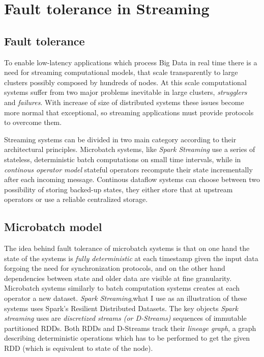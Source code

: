 \section{Fault tolerance in Streaming}


\subsection{Fault tolerance}\label{faultolerance}
To enable low-latency applications which process Big Data in real time there is a need for streaming computational models, that scale transparently to large clusters possibly composed by hundreds of nodes. At this scale computational systems suffer from two major problems inevitable in large clusters, \textit{strugglers} and \textit{failures}. With increase of size of distributed systems these issues become more normal that exceptional, so streaming applications must provide protocols to overcome them.

Streaming systems can be divided in two main category according to their architectural principles. Microbatch systems, like \textit{Spark Streaming} \cite{discretizedstreams} use a series of stateless, deterministic batch computations on small time intervals, while in \textit{continous operator model} stateful operators recompute their state incrementally after each incoming message. Continous dataflow systems can choose between two possibility of storing backed-up states, they either store that at upstream operators\cite{mapreduceonline}\cite{storm} or use a reliable centralized storage\cite{millwheel}\cite{stratosphere}. 
\subsection{Microbatch model}


The idea behind fault tolerance of microbatch systems is that on one hand the state of the systems is \textit{fully deterministic} at each timestamp given the input data forgoing the need for synchronization protocols, and on the other hand dependencies between state and older data are visible at fine granularity. Microbatch systems similarly to batch computation systems creates at each operator a new dataset.  \textit{Spark Streaming},what I use as an illustration of these systems uses  Spark's Resilient Distributed Datasets\cite{rdd}. The key objects \textit{Spark streaming} uses are \textit{discretized streams (or D-Streams)} sequences of immutable partitioned RDDs. Both RDDs and D-Streams track their \textit{lineage graph}, a graph describing deterministic operations which has to be performed to get the given RDD (which is equivalent to state of the node).

